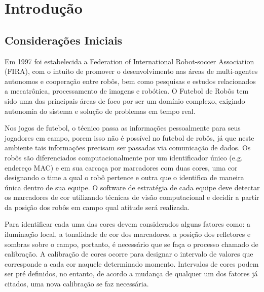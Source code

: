 \chapter{Introdução} \label{Cap:Introducao}
\section{Considerações Iniciais}
Em 1997 foi estabelecida a Federation of International Robot-soccer Association (FIRA), com o intuito de promover o desenvolvimento nas áreas de multi-agentes autonomos e cooperação entre robôs, bem como pesquisas e estudos relacionados a mecatrônica, processamento de imagens e robótica\cite{FiraHistory,FiraOverview}. O Futebol de Robôs tem sido  uma das principais áreas de foco por ser um domínio complexo, exigindo autonomia do sistema e solução de problemas em tempo real\cite{Costa:2000,Faria2006}. 

Nos jogos de futebol, o técnico passa as informações pessoalmente para seus jogadores em campo, porem isso não é possível no futebol de robôs, já que neste ambiente tais informações precisam ser passadas via comunicação de dados.%
Os robôs são diferenciados computacionalmente por um identificador único (e.g. endereço MAC) e em sua carcaça por marcadores com duas cores, uma cor designando o time a qual o robô pertence e outra que o identifica de maneira única dentro de sua equipe. O software de estratégia de cada equipe deve detectar os marcadores de cor utilizando técnicas de visão computacional e decidir a partir da posição dos robôs em campo qual atitude será realizada.

Para identificar cada uma das cores devem considerados alguns fatores como: a iluminação local, a tonalidade de cor dos marcadores, a posição dos refletores e sombras sobre o campo, portanto, é necessário que se faça o processo chamado de calibração. A calibração de cores ocorre para designar o intervalo de valores que corresponde a cada cor naquele determinado momento. Intervalos de cores podem ser pré definidos, no entanto, de acordo a mudança de qualquer um dos fatores já citados, uma nova calibração se faz necessária.



